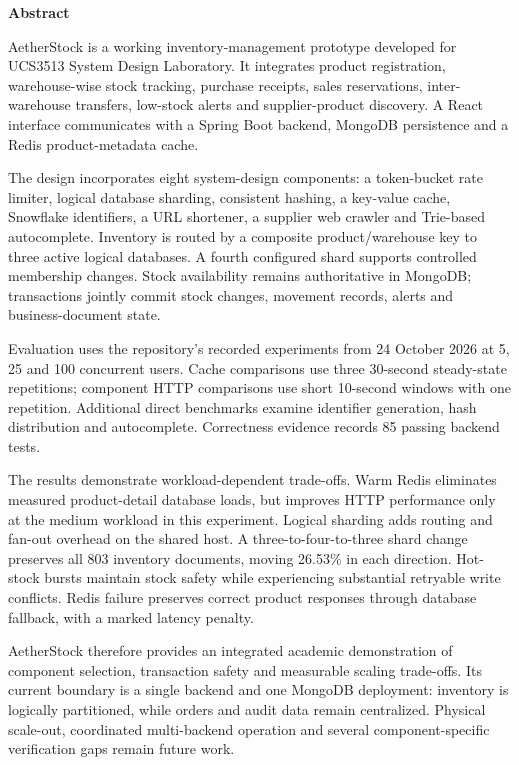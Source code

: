 \documentclass[11pt,a4paper]{article}
\newcommand{\ReportProjectName}{AetherStock}
\newcommand{\ReportTitle}[3]{%
  \phantomsection\hypertarget{#2}{}%
  \addcontentsline{toc}{#3}{#1}%
  {\sffamily\bfseries\color{Navy}\fontsize{18bp}{22.5bp}\selectfont #1\par}%
  \nobreak\vspace{6bp}}
\begin{document}

\ReportTitle{Abstract}{abstract}{section}

\ReportProjectName{} is a working inventory-management prototype developed for UCS3513 System Design Laboratory.
It integrates product registration, warehouse-wise stock tracking, purchase receipts, sales reservations,
inter-warehouse transfers, low-stock alerts and supplier-product discovery. A React interface communicates with
a Spring Boot backend, MongoDB persistence and a Redis product-metadata cache.


The design incorporates eight system-design components: a token-bucket rate limiter, logical database sharding,
consistent hashing, a key-value cache, Snowflake identifiers, a URL shortener, a supplier web crawler and
Trie-based autocomplete. Inventory is routed by a composite product/warehouse key to three active logical
databases. A fourth configured shard supports controlled membership changes. Stock availability remains
authoritative in MongoDB; transactions jointly commit stock changes, movement records, alerts and
business-document state.


Evaluation uses the repository's recorded experiments from 24 October 2026 at 5, 25 and 100 concurrent users.
Cache comparisons use three 30-second steady-state repetitions; component HTTP comparisons use short 10-second
windows with one repetition. Additional direct benchmarks examine identifier generation, hash distribution and
autocomplete. Correctness evidence records 85 passing backend tests.


The results demonstrate workload-dependent trade-offs. Warm Redis eliminates measured product-detail database
loads, but improves HTTP performance only at the medium workload in this experiment. Logical sharding adds
routing and fan-out overhead on the shared host. A three-to-four-to-three shard change preserves all 803
inventory documents, moving 26.53\% in each direction. Hot-stock bursts maintain stock safety while experiencing
substantial retryable write conflicts. Redis failure preserves correct product responses through database
fallback, with a marked latency penalty.


\ReportProjectName{} therefore provides an integrated academic demonstration of component selection, transaction
safety and measurable scaling trade-offs. Its current boundary is a single backend and one MongoDB deployment:
inventory is logically partitioned, while orders and audit data remain centralized. Physical scale-out,
coordinated multi-backend operation and several component-specific verification gaps remain future work.
\end{document}
